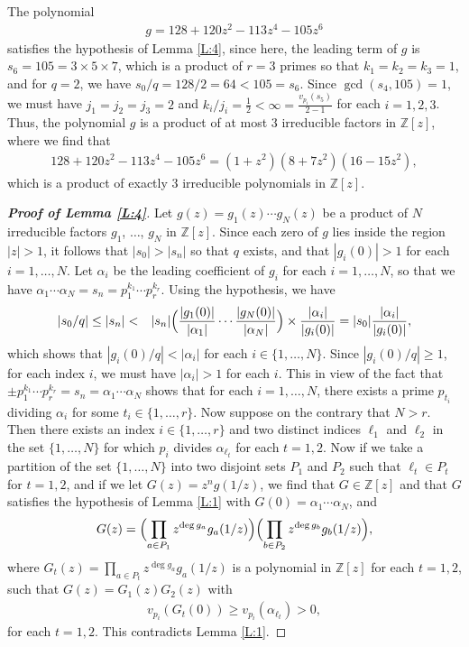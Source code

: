 \documentclass[12pt]{amsart}%
\begin{document}
The polynomial
\begin{eqnarray*}
g=128 + 120 z^2 - 113 z^4 - 105 z^6
\end{eqnarray*}
satisfies the hypothesis of Lemma \ref{L:4}, since here, the leading term of $g$ is $s_6=105=3\times 5\times 7$, which
 is a product of $r=3$ primes so that $k_1=k_2=k_3=1$, and for $q=2$, we have $s_0/q=128/2=64<105=s_6$. Since $\gcd(s_4,105)=1$, we must have $j_1=j_2=j_3=2$ and $k_i/j_i=\frac{1}{2}< \infty=\frac{v_{p_i}(s_{5})}{2-1}$ for each $i=1,2,3$. Thus, the polynomial $g$ is a
product of at most $3$ irreducible factors in $\mathbb{Z}[z]$, where we find that
\begin{eqnarray*}
128 + 120 z^2 - 113 z^4 - 105 z^6=(1 + z^2) (8 + 7 z^2) (16 - 15 z^2),
\end{eqnarray*}
which is a product of exactly 3 irreducible polynomials in $\mathbb{Z}[z]$.
\begin{proof}[\bf Proof of Lemma \ref{L:4}]
Let $g(z)=g_1(z)\cdots g_N(z)$ be a product of $N$ irreducible factors $g_1$, $\ldots$, $g_N$ in $\mathbb{Z}[z]$. Since each zero of $g$ lies inside the region $|z|>1$, it follows that $|s_0|>|s_n|$ so that $q$ exists,  and that $|g_i(0)|>1$ for each $i=1,\ldots,N$. Let $\alpha_i$ be the leading coefficient of $g_i$ for each $i=1,\ldots, N$, so that we have $\alpha_1\cdots  \alpha_N=s_n=p_1^{k_1}\cdots p_r^{k_r}$. Using the hypothesis, we have
\begin{eqnarray*}
|s_0/q| \leq |s_n|&<&|s_n|\Bigl(\frac{|g_1(0)|}{|\alpha_1|}\cdots \frac{|g_N(0)|}{|\alpha_N|}\Bigr)\times \frac{|\alpha_i|}{|g_i(0)|}= |s_0|\frac{|\alpha_i|}{|g_i(0)|},
\end{eqnarray*}
which shows that $|g_i(0)/q|<|\alpha_i|$ for each $i\in\{1,\ldots,N\}$. Since  $|g_i(0)/q|\geq 1$, for each index $i$, we must have $|\alpha_i|>1$ for each $i$. This in view of the fact that $\pm p_1^{k_1}\cdots p_r^{k_r}=s_n=\alpha_1\cdots \alpha_N$ shows that for each $i=1,\ldots,N$, there exists a prime $p_{t_i}$ dividing $\alpha_i$ for some $t_i\in \{1,\ldots,r\}$.
Now suppose on the contrary that $N>r$. Then there exists an index $i\in \{1,\ldots,r\}$ and two distinct indices $\ell_1$ and $\ell_2$ in the set $\{1,\ldots, N\}$ for which $p_i$ divides $\alpha_{\ell_t}$ for each $t=1,2$. Now if we take a partition of the set $\{1,\ldots, N\}$ into two disjoint sets $P_1$ and $P_2$ such that $\ell_t\in P_t$  for $t=1,2$, and if we let   $G(z)=z^{n}g(1/z)$, we find that $G\in \mathbb{Z}[z]$ and that $G$ satisfies the hypothesis of Lemma \ref{L:1} with $G(0)=\alpha_1\cdots \alpha_N$, and
 \begin{eqnarray*}
G(z)=\Bigl(\prod_{a\in P_1}z^{\deg g_a}g_a(1/z)\Bigr)\Bigl(\prod_{b\in P_2}z^{\deg g_b}g_b(1/z)\Bigr),
  \end{eqnarray*}
  where $G_t(z)=\prod_{a\in P_t}z^{\deg g_a}g_a(1/z)$ is a polynomial  in $\mathbb{Z}[z]$ for each $t=1,2$, such that $G(z)=G_1(z)G_2(z)$ with
  \begin{eqnarray*}
v_{p_i}(G_t(0))\geq v_{p_i}(\alpha_{\ell_t})>0,
  \end{eqnarray*}
for each $t=1,2$. This contradicts  Lemma \ref{L:1}.
\end{proof}
\end{document}

